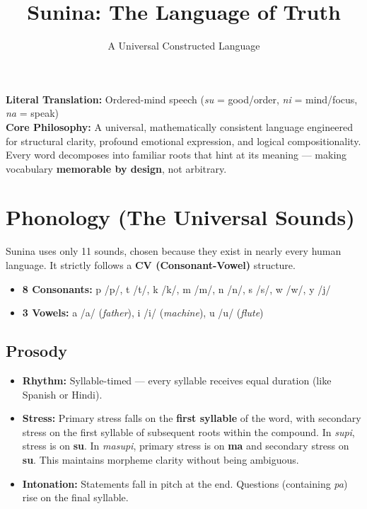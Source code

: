 \documentclass[12pt, a4paper]{article}
\title{\textbf{Sunina: The Language of Truth}}
\author{A Universal Constructed Language}
\date{}
\begin{document}
\maketitle

\textbf{Literal Translation:} Ordered-mind speech (\textit{su} = good/order, \textit{ni} = mind/focus, \textit{na} = speak) \\
\textbf{Core Philosophy:} A universal, mathematically consistent language engineered for structural clarity, profound emotional expression, and logical compositionality. Every word decomposes into familiar roots that hint at its meaning --- making vocabulary \textbf{memorable by design}, not arbitrary.

\tableofcontents
\bigskip

\section{Phonology (The Universal Sounds)}
Sunina uses only 11 sounds, chosen because they exist in nearly every human language. It strictly follows a \textbf{CV (Consonant-Vowel)} structure.
\begin{itemize}
    \item \textbf{8 Consonants:} p /p/, t /t/, k /k/, m /m/, n /n/, s /s/, w /w/, y /j/
    \item \textbf{3 Vowels:} a /a/ (\textit{father}), i /i/ (\textit{machine}), u /u/ (\textit{flute})
\end{itemize}

\subsection{Prosody}
\begin{itemize}
    \item \textbf{Rhythm:} Syllable-timed --- every syllable receives equal duration (like Spanish or Hindi).
    \item \textbf{Stress:} Primary stress falls on the \textbf{first syllable} of the word, with secondary stress on the first syllable of subsequent roots within the compound. In \textit{supi}, stress is on \textbf{su}. In \textit{masupi}, primary stress is on \textbf{ma} and secondary stress on \textbf{su}. This maintains morpheme clarity without being ambiguous.
    \item \textbf{Intonation:} Statements fall in pitch at the end. Questions (containing \textit{pa}) rise on the final syllable.
\end{itemize}
\end{document}
